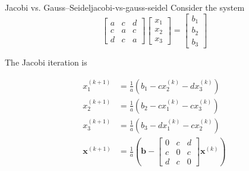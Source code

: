 \begin{example}{Jacobi vs. Gauss--Seidel}{jacobi-vs-gauss-seidel}
    Consider the system
    \begin{equation*}
        \begin{bmatrix}
            a & c & d \\
            c & a & c \\
            d & c & a
        \end{bmatrix}
        \begin{bmatrix}
            x_1 \\ x_2 \\ x_3
        \end{bmatrix}
        =
        \begin{bmatrix}
            b_1 \\ b_2 \\ b_3
        \end{bmatrix}
    \end{equation*}

    The Jacobi iteration is

    \begin{align*}
        x_1^{(k+1)}        & = \frac{1}{a}(b_1 - c x_2^{(k)} - d x_3^{(k)})             \\
        x_2^{(k+1)}        & = \frac{1}{a}(b_2 - c x_1^{(k)} - c x_3^{(k)})             \\
        x_3^{(k+1)}        & = \frac{1}{a}(b_3 - d x_1^{(k)} - c x_2^{(k)})             \\
        \mathbf{x}^{(k+1)} & = \frac{1}{a}(\mathbf{b} - \begin{bmatrix}
                                                            0 & c & d \\
                                                            c & 0 & c \\
                                                            d & c & 0
                                                        \end{bmatrix} \mathbf{x}^{(k)})
    \end{align*}


\end{example}
